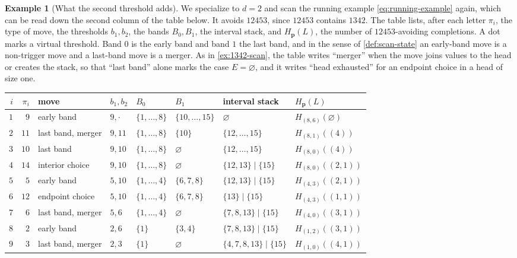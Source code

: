 \documentclass[11pt,reqno]{amsart}
\theoremstyle{definition}
\newtheorem{example}[example]{Example}
\theoremstyle{remark}
\begin{document}
\begin{example}[What the second threshold adds]\label{ex:full-state}
We specialize to $d=2$ and scan the running example
\eqref{eq:running-example} again, which can be read down the second column
of the table below.  It avoids $12453$, since $12453$ contains
$1342$.  The table lists, after each letter $\pi_i$, the type of move, the
thresholds $b_1,b_2$, the bands $B_0,B_1$, the interval stack, and
$H_{\mathbf p}(L)$, the number of $12453$-avoiding completions.  A dot marks
a virtual threshold.  Band $0$ is the early band and band $1$ the last band,
and in the sense of \cref{def:scan-state} an early-band move is a
non-trigger move and a last-band move is a merger.  As in \cref{ex:1342-scan}, the table
writes ``merger'' when the move joins values to the head or creates the
stack, so that ``last band'' alone marks the case $E=\varnothing$, and it
writes ``head exhausted'' for an endpoint choice in a head of size one.
\begin{center}
\footnotesize
\setlength{\tabcolsep}{3.5pt}
\begin{tabular}{@{}rrllllll@{}}
\toprule
$i$ & $\pi_i$ & move & $b_1,b_2$ & $B_0$ & $B_1$ & interval stack & $H_{\mathbf p}(L)$ \\
\midrule
$1$ & $9$ & early band & $9,\cdot$ & $\{1,\ldots,8\}$ & $\{10,\ldots,15\}$ & $\varnothing$ & $H_{(8,6)}(\varnothing)$ \\
$2$ & $11$ & last band, merger & $9,11$ & $\{1,\ldots,8\}$ & $\{10\}$ & $\{12,\ldots,15\}$ & $H_{(8,1)}((4))$ \\
$3$ & $10$ & last band & $9,10$ & $\{1,\ldots,8\}$ & $\varnothing$ & $\{12,\ldots,15\}$ & $H_{(8,0)}((4))$ \\
$4$ & $14$ & interior choice & $9,10$ & $\{1,\ldots,8\}$ & $\varnothing$ & $\{12,13\}\mid\{15\}$ & $H_{(8,0)}((2,1))$ \\
$5$ & $5$ & early band & $5,10$ & $\{1,\ldots,4\}$ & $\{6,7,8\}$ & $\{12,13\}\mid\{15\}$ & $H_{(4,3)}((2,1))$ \\
$6$ & $12$ & endpoint choice & $5,10$ & $\{1,\ldots,4\}$ & $\{6,7,8\}$ & $\{13\}\mid\{15\}$ & $H_{(4,3)}((1,1))$ \\
$7$ & $6$ & last band, merger & $5,6$ & $\{1,\ldots,4\}$ & $\varnothing$ & $\{7,8,13\}\mid\{15\}$ & $H_{(4,0)}((3,1))$ \\
$8$ & $2$ & early band & $2,6$ & $\{1\}$ & $\{3,4\}$ & $\{7,8,13\}\mid\{15\}$ & $H_{(1,2)}((3,1))$ \\
$9$ & $3$ & last band, merger & $2,3$ & $\{1\}$ & $\varnothing$ & $\{4,7,8,13\}\mid\{15\}$ & $H_{(1,0)}((4,1))$ \\

\end{tabular}
\end{center}
\end{example}
\end{document}

